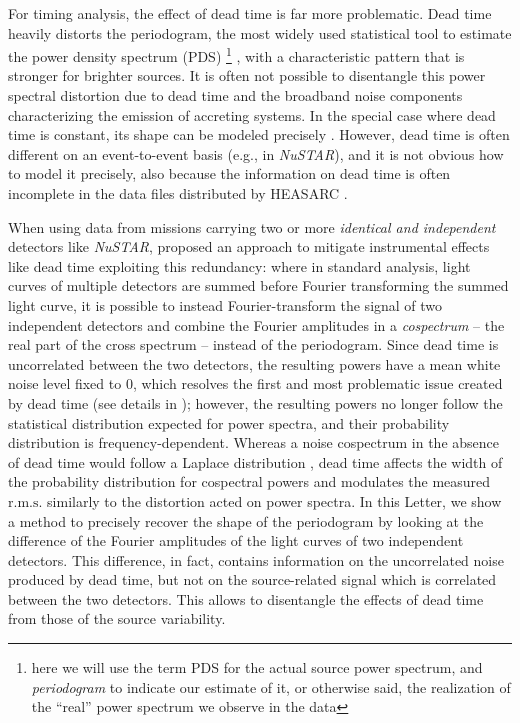 \documentclass[twocolumn]{aastex61}
\newcommand{\project}[1]{\textsl{#1}}
\newcommand{\nustar}{\project{NuSTAR}\xspace}
\newcommand{\rms}{\ensuremath{\mathrm{r.m.s.}}\xspace}
\begin{document}
For timing analysis, the effect of dead time is far more problematic.
Dead time heavily distorts the periodogram, the most widely used statistical tool to estimate the power density spectrum (PDS)%
\footnote{here we will use the term PDS for the actual source power spectrum, and \textit{periodogram} to indicate our estimate of it, or otherwise said, the realization of the ``real'' power spectrum we observe in the data}%
, with a characteristic pattern that is stronger for brighter sources. 
It is often not possible to disentangle this power spectral distortion due to dead time and the broadband noise components characterizing the emission of accreting systems.
In the special case where dead time is constant, its shape can be modeled precisely \citep{Zhang+95,Vikhlinin+94}.
However, dead time is often different on an event-to-event basis (e.g., in \nustar), and it is not obvious how to model it precisely, also because the information on dead time is often incomplete in the data files distributed by HEASARC \citep[see, e.g.][]{Bachetti+15}.


When using data from missions carrying two or more \textit{identical and independent} detectors like \nustar, \citet{Bachetti+15} proposed an approach to mitigate instrumental effects like dead time exploiting this redundancy: 
where in standard analysis, light curves of multiple detectors are summed before Fourier transforming the summed light curve, 
it is possible to instead Fourier-transform the signal of two independent detectors and combine the Fourier amplitudes in a \textit{cospectrum} -- the real part of the cross spectrum -- instead of the periodogram. 
Since dead time is uncorrelated between the two detectors, the resulting powers have a mean white noise level fixed to 0, which resolves the first and most problematic issue created by dead time (see details in \citealt{Bachetti+15}); however, the resulting powers no longer follow the statistical distribution expected for power spectra, and their probability distribution is frequency-dependent.
Whereas a noise cospectrum in the absence of dead time would follow a Laplace distribution \citep{HuppenkothenBachetti18},
dead time affects the width of the probability distribution for cospectral powers and modulates the measured \rms similarly to the distortion acted on power spectra.
In this Letter, we show a method to precisely recover the shape of the periodogram by looking at the difference of the Fourier amplitudes of the light curves of two independent detectors.
This difference, in fact, contains information on the uncorrelated noise produced by dead time, but not on the source-related  signal which is correlated between the two detectors.
This allows to disentangle the effects of dead time from those of the source variability.
\end{document}

